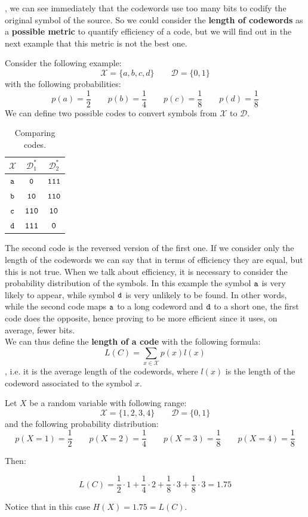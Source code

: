 , we can see immediately that the codewords use too many bits to codify the original symbol of the source. So we could consider the \textbf{length of codewords} as a \textbf{possible metric} to quantify efficiency of a code, but we will find out in the next example that this metric is not the best one.
\begin{exmp} Consider the following example:
	$$\mathcal{X} = \{a, b, c, d\} \qquad \mathcal{D} = \{0,1\}$$
	with the following probabilities:
	$$p(a) = \frac{1}{2} \qquad p(b) = \frac{1}{4} \qquad p(c) = \frac{1}{8} \qquad p(d) = \frac{1}{8}$$
	We can define two possible codes to convert symbols from $\mathcal{X}$ to $\mathcal{D}$.
	\begin{table}[H]
		\centering
		\begin{tabular}{| c | c | c |}
			\hline
			$\mathcal{X}$ & $\mathcal{D}^*_1$ & $\mathcal{D}^*_2$\\\hline
			$\verb|a|$ & $\verb|0|$ & $\verb|111|$ \\
			$\verb|b|$ & $\verb|10|$ & $\verb|110|$ \\
			$\verb|c|$ & $\verb|110|$ & $\verb|10|$ \\
			$\verb|d|$ & $\verb|111|$ & $\verb|0|$ \\
			\hline
		\end{tabular}
		\caption{Comparing codes.}
	\end{table}
\end{exmp}
The second code is the reversed version of the first one. If we consider only the length of the codewords we can say that in terms of efficiency they are equal, but this is not true. When we talk about efficiency, it is necessary to consider the probability distribution of the symbols. In this example the symbol $\verb|a|$ is very likely to appear, while symbol $\verb|d|$ is very unlikely to be found. In other words, while the second code maps $\verb|a|$ to a long codeword and $\verb|d|$ to a short one, the first code does the opposite, hence proving to be more efficient since it uses, on average, fewer bits.\\
We can thus define the \textbf{length of a code} with the following formula:
		$$ L(C) = \sum_{x \in \mathcal{X}} p(x) l(x) $$
, i.e. it is the average length of the codewords,
where $l(x)$ is the length of the codeword associated to the symbol $x$.

\begin{exmp} Let $X$ be a random variable with following range:
	$$\mathcal{X} = \{1, 2, 3, 4\} \qquad \mathcal{D} = \{0,1\}$$
	and the following probability distribution:
	$$p(X = 1) = \frac{1}{2} \qquad p(X = 2) = \frac{1}{4} \qquad p(X = 3) = \frac{1}{8} \qquad p(X = 4) = \frac{1}{8}$$

Then:

$$
L(C) = \frac{1}{2} \cdot 1 + \frac{1}{4} \cdot 2 + \frac{1}{8} \cdot 3 + \frac{1}{8} \cdot 3 = 1.75
$$

Notice that in this case $H(X) = 1.75 = L(C)$.

\end{exmp}

